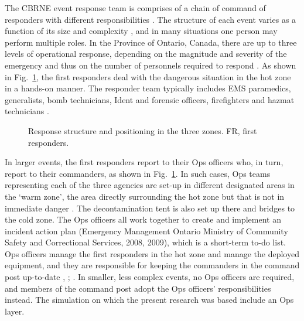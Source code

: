 \documentclass[link]{IWCOMP}
\begin{document}
The CBRNE event response team is comprises of a chain of command of
responders with different responsibilities \citep{bib12}. The
structure of each event varies as a function of its size and complexity
\citep{bib28}, and in many situations one person may perform multiple
roles. In the Province of Ontario, Canada, there are up to three levels of
operational response, depending on the magnitude and severity of the
emergency and thus on the number of personnels required to respond
\citep{bib7}. As shown in Fig.~\ref{fig1}, the first responders deal with the
dangerous situation in the hot zone in a hands-on manner. The responder team
typically includes EMS paramedics, generalists, bomb technicians, Ident and
forensic officers, firefighters and hazmat technicians \citep{bib38}.

\begin{figure}[hbt!]
\centerline{}
\caption{Response structure and positioning in the three zones.
FR, first responders.\label{fig1}}
\end{figure}

 In larger events, the first responders report to their Ops officers who, in
turn, report to their commanders, as shown in Fig.~\ref{fig1}. In such cases, Ops
teams representing each of the three agencies are set-up in different
designated areas in the `warm zone', the area directly surrounding the hot
zone but that is not in immediate danger \citep{bib12}. The
decontamination tent is also set up there and bridges to the cold zone. The
Ops officers all work together to create and implement an incident action
plan (Emergency Management Ontario Ministry of Community Safety and
Correctional Services, 2008, 2009), which is a short-term to-do list. Ops
officers manage the first responders in the hot zone and manage the deployed
equipment, and they are responsible for keeping the commanders in the
command post up-to-date \citet{bib7}, \citet{bib8}; \citep{bib24}. In smaller, less
complex events, no Ops officers are required, and members of the command
post adopt the Ops officers' responsibilities instead. The simulation on
which the present research was based include an Ops layer.
\end{document}
